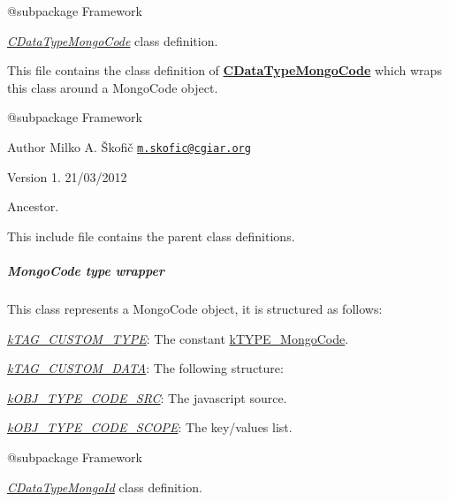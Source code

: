 \begin{DoxyVerb} @subpackage        Framework\end{DoxyVerb}


{\itshape \hyperlink{class_c_data_type_mongo_code}{C\-Data\-Type\-Mongo\-Code}} class definition.

This file contains the class definition of {\bfseries \hyperlink{class_c_data_type_mongo_code}{C\-Data\-Type\-Mongo\-Code}} which wraps this class around a Mongo\-Code object.

\begin{DoxyVerb} @subpackage        Framework
\end{DoxyVerb}


\begin{DoxyAuthor}{Author}
Milko A. Škofič \href{mailto:m.skofic@cgiar.org}{\tt m.\-skofic@cgiar.\-org} 
\end{DoxyAuthor}
\begin{DoxyVersion}{Version}
1. 21/03/2012
\end{DoxyVersion}
Ancestor.

This include file contains the parent class definitions. \subparagraph*{{\itshape Mongo\-Code} type wrapper}

This class represents a Mongo\-Code object, it is structured as follows\-:


\begin{DoxyItemize}
\item {\itshape \hyperlink{}{k\-T\-A\-G\-\_\-\-C\-U\-S\-T\-O\-M\-\_\-\-T\-Y\-P\-E}}\-: The constant \hyperlink{}{k\-T\-Y\-P\-E\-\_\-\-Mongo\-Code}. 
\item {\itshape \hyperlink{}{k\-T\-A\-G\-\_\-\-C\-U\-S\-T\-O\-M\-\_\-\-D\-A\-T\-A}}\-: The following structure\-: 
\begin{DoxyItemize}
\item {\itshape \hyperlink{}{k\-O\-B\-J\-\_\-\-T\-Y\-P\-E\-\_\-\-C\-O\-D\-E\-\_\-\-S\-R\-C}}\-: The javascript source. 
\item {\itshape \hyperlink{}{k\-O\-B\-J\-\_\-\-T\-Y\-P\-E\-\_\-\-C\-O\-D\-E\-\_\-\-S\-C\-O\-P\-E}}\-: The key/values list. 
\end{DoxyItemize}
\end{DoxyItemize}

\begin{DoxyVerb} @subpackage        Framework\end{DoxyVerb}


{\itshape \hyperlink{class_c_data_type_mongo_id}{C\-Data\-Type\-Mongo\-Id}} class definition.

